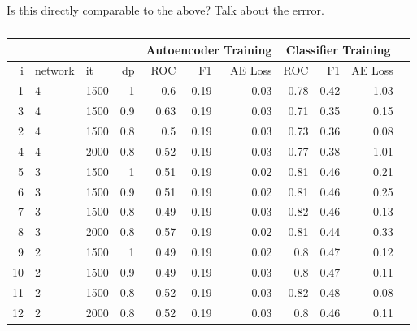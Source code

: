       Is this directly comparable to the above? Talk about the errror.
      \begin{table}[!h] \centering
      {\small
      \begin{tabular}{rllrrrrrrrr}
        &&& &  \multicolumn{3}{|c|}{Autoencoder Training} &  \multicolumn{3}{c|}{Classifier Training}    \\
      \hline
         i & network             &   it &   dp &   ROC&F1&AE Loss & ROC & F1 & AE Loss \\
      \hline
         1 & 4 & 1500 &  1   &    0.6  &   0.19 &     0.03 &    0.78 &   0.42 &     1.03 \\
         3 & 4 & 1500 &  0.9 &    0.63 &   0.19 &     0.03 &    0.71 &   0.35 &     0.15 \\
         2 & 4 & 1500 &  0.8 &    0.5  &   0.19 &     0.03 &    0.73 &   0.36 &     0.08 \\
      \hline
         4 & 4 & 2000 &  0.8 &    0.52 &   0.19 &     0.03 &    0.77 &   0.38 &     1.01 \\
      \hline
         5 & 3 & 1500 &  1   &    0.51 &   0.19 &     0.02 &    0.81 &   0.46 &     0.21 \\
         6 & 3 & 1500 &  0.9 &    0.51 &   0.19 &     0.02 &    0.81 &   0.46 &     0.25 \\
         7 & 3 & 1500 &  0.8 &    0.49 &   0.19 &     0.03 &    0.82 &   0.46 &     0.13 \\
      \hline
         8 & 3 & 2000 &  0.8 &    0.57 &   0.19 &     0.02 &    0.81 &   0.44 &     0.33 \\
      \hline
         9 & 2  & 1500 &  1   &    0.49 &   0.19 &     0.02 &    0.8  &   0.47 &     0.12 \\
        10 & 2  & 1500 &  0.9 &    0.49 &   0.19 &     0.03 &    0.8  &   0.47 &     0.11 \\
        11  & 2 & 1500 &  0.8 &    0.52 &   0.19 &     0.03 &    0.82 &   0.48 &     0.08 \\
      \hline
        12  & 2 & 2000 &  0.8 &    0.52 &   0.19 &     0.03 &    0.8  &   0.46 &     0.11 \\
      \hline
      \end{tabular}}\caption{} \label{tab:pseaafasfrch} \end{table}


      \newpage
